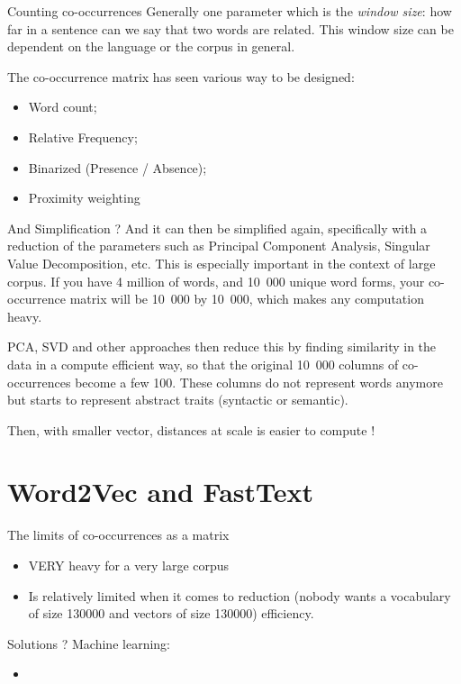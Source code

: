 \documentclass[aspectratio=169]{beamer}
\begin{document}
\begin{frame}{Counting co-occurrences}
    Generally one parameter which is the \textit{window size}: how far in a sentence can we say that two words are related. This window size can be dependent on the language or the corpus in general.
    
    The co-occurrence matrix has seen various way to be designed:
    \begin{itemize}
        \item Word count;
        \item Relative Frequency;
        \item Binarized (Presence / Absence);
        \item Proximity weighting
    \end{itemize}
\end{frame}

\begin{frame}{And Simplification ?}
    And it can then be simplified again, specifically with a reduction of the parameters such as Principal Component Analysis, Singular Value Decomposition, etc. This is especially important in the context of large corpus. If you have 4 million of words, and 10~000 unique word forms, your co-occurrence matrix will be 10~000 by 10~000, which makes any computation heavy. 

    PCA, SVD and other approaches then reduce this by finding similarity in the data in a compute efficient way, so that the original 10~000 columns of co-occurrences become a few 100. These columns do not represent words anymore but starts to represent abstract traits (syntactic or semantic).

    Then, with smaller vector, distances at scale is easier to compute !
\end{frame}

\section{Word2Vec and FastText}

\begin{frame}{The limits of co-occurrences as a matrix}
    \begin{itemize}
        \item VERY heavy for a very large corpus
        \item Is relatively limited when it comes to reduction (nobody wants a vocabulary of size 130000 and vectors of size 130000) efficiency.
    \end{itemize}
    Solutions ? Machine learning:
    \begin{itemize}
        \item {}
    \end{itemize}
\end{frame}
\end{document}
